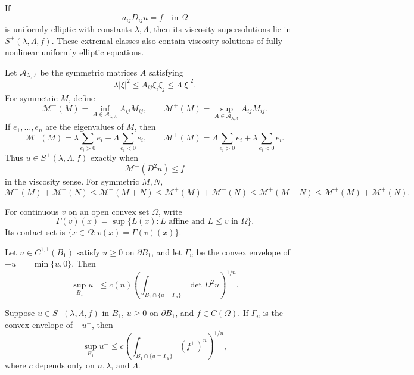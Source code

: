 \begin{remark}\label{hanlin:ch05-rem-5-5}
If
\[
a_{ij}D_{ij}u=f\quad\text{in }\Omega
\]
is uniformly elliptic with constants $\lambda,\Lambda$, then its viscosity
supersolutions lie in $S^+(\lambda,\Lambda,f)$. These extremal classes also
contain viscosity solutions of fully nonlinear uniformly elliptic equations.
\end{remark}

\begin{example}\label{hanlin:ch05-ex-5-6}
Let $\mathcal A_{\lambda,\Lambda}$ be the symmetric matrices $A$ satisfying
\[
\lambda|\xi|^2\leq A_{ij}\xi_i\xi_j\leq\Lambda|\xi|^2.
\]
For symmetric $M$, define
\[
\mathcal M^-(M)=\inf_{A\in\mathcal A_{\lambda,\Lambda}}A_{ij}M_{ij},
\qquad
\mathcal M^+(M)=\sup_{A\in\mathcal A_{\lambda,\Lambda}}A_{ij}M_{ij}.
\]
If $e_1,\dots,e_n$ are the eigenvalues of $M$, then
\[
\mathcal M^-(M)=\lambda\sum_{e_i>0}e_i+\Lambda\sum_{e_i<0}e_i,
\qquad
\mathcal M^+(M)=\Lambda\sum_{e_i>0}e_i+\lambda\sum_{e_i<0}e_i.
\]
Thus $u\in S^+(\lambda,\Lambda,f)$ exactly when
\[
\mathcal M^-(D^2u)\leq f
\]
in the viscosity sense. For symmetric $M,N$,
\[
\mathcal M^-(M)+\mathcal M^-(N)
\leq\mathcal M^-(M+N)
\leq\mathcal M^+(M)+\mathcal M^-(N)
\leq\mathcal M^+(M+N)
\leq\mathcal M^+(M)+\mathcal M^+(N).
\]
\end{example}

For continuous $v$ on an open convex set $\Omega$, write
\[
\Gamma(v)(x)=\sup\{L(x):L\text{ affine and }L\leq v\text{ in }\Omega\}.
\]
Its contact set is $\{x\in\Omega:v(x)=\Gamma(v)(x)\}$.

\begin{lemma}\label{hanlin:ch05-lem-5-7}
Let $u\in C^{1,1}(B_1)$ satisfy $u\geq0$ on $\partial B_1$, and let
$\Gamma_u$ be the convex envelope of $-u^-=\min\{u,0\}$. Then
\[
\sup_{B_1}u^-
\leq c(n)\left(\int_{B_1\cap\{u=\Gamma_u\}}\det D^2u\right)^{1/n}.
\]
\end{lemma}

\begin{theorem}\label{hanlin:ch05-thm-5-8}
Suppose $u\in S^+(\lambda,\Lambda,f)$ in $B_1$, $u\geq0$ on
$\partial B_1$, and $f\in C(\Omega)$. If $\Gamma_u$ is the convex envelope
of $-u^-$, then
\[
\sup_{B_1}u^-
\leq c\left(\int_{B_1\cap\{u=\Gamma_u\}}(f^+)^n\right)^{1/n},
\]
where $c$ depends only on $n,\lambda$, and $\Lambda$.
\end{theorem}

